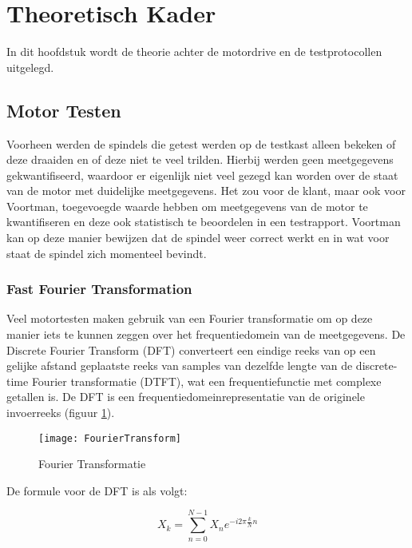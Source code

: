 \section{Theoretisch Kader} \label{sec:TheoretischKader}

In dit hoofdstuk wordt de theorie achter de motordrive en de testprotocollen uitgelegd.

\subsection{Motor Testen}

Voorheen werden de spindels die getest werden op de testkast alleen bekeken of deze draaiden en of deze niet te veel trilden. Hierbij werden geen meetgegevens gekwantifiseerd, waardoor er eigenlijk niet veel gezegd kan worden over de staat van de motor met duidelijke meetgegevens. Het zou voor de klant, maar ook voor Voortman, toegevoegde waarde hebben om meetgegevens van de motor te kwantifiseren en deze ook statistisch te beoordelen in een testrapport. Voortman kan op deze manier bewijzen dat de spindel weer correct werkt en in wat voor staat de spindel zich momenteel bevindt.

\subsubsection{Fast Fourier Transformation}

Veel motortesten maken gebruik van een Fourier transformatie om op deze manier iets te kunnen zeggen over het frequentiedomein van de meetgegevens. De Discrete Fourier Transform (\gls{DFT}) converteert een eindige reeks van op een gelijke afstand geplaatste reeks van samples van dezelfde lengte van de discrete-time Fourier transformatie (\gls{DTFT}), wat een frequentiefunctie met complexe getallen is. De \gls{DFT} is een frequentiedomeinrepresentatie van de originele invoerreeks (figuur \ref{fig:FourierTransform}).

\begin{figure}[h]
	\centering
	\texttt{[image: FourierTransform]}
	\label{fig:FourierTransform}
	\caption{Fourier Transformatie \cite{web:FFT}}
\end{figure}

\newpage

De formule voor de \gls{DFT} is als volgt:

\begin{equation}
	X_k = \sum_{n=0}^{N-1}X_n e^{-i2\pi\frac{k}{N}n}
\end{equation}

